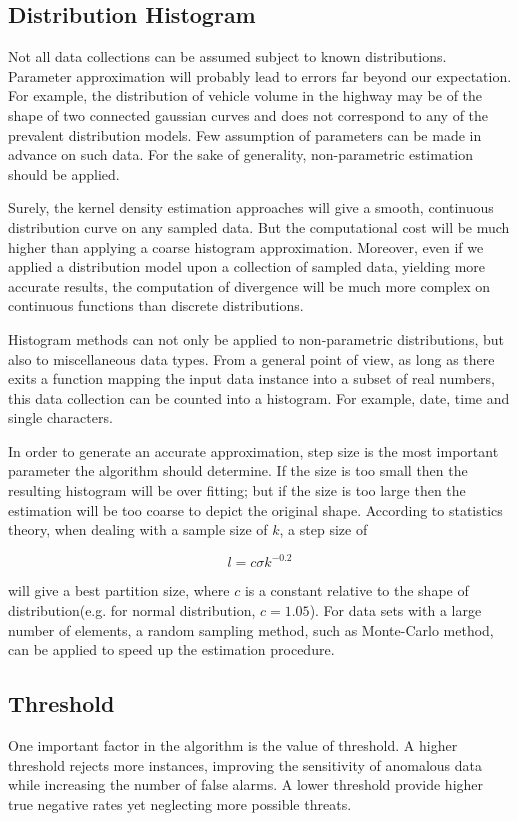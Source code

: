 \documentclass[10pt,conference,letterpaper]{IEEEtran}
\begin{document}
		\subsection{Distribution Histogram}\label{sec:alg-histogram}
			Not all data collections can be assumed subject to known distributions. Parameter approximation will probably lead to errors far beyond our expectation. For example, the distribution of vehicle volume in the highway may be of the shape of two connected gaussian curves and does not correspond to any of the prevalent distribution models. Few assumption of parameters can be made in advance on such data. For the sake of generality, non-parametric estimation should be applied.
			
			Surely, the kernel density estimation approaches will give a smooth, continuous distribution curve on any sampled data. But the computational cost will be much higher than applying a coarse histogram approximation.
			Moreover, even if we applied a distribution model upon a collection of sampled data, yielding more accurate results, the computation of divergence will be much more complex on continuous functions than discrete distributions.
			
			Histogram methods can not only be applied to non-parametric distributions, but also to miscellaneous data types. From a general point of view, as long as there exits a function mapping the input data instance into a subset of real numbers, this data collection can be counted into a histogram. For example, date, time and single characters.
	
			In order to generate an accurate approximation, step size is the most important parameter the algorithm should determine. If the size is too small then the resulting histogram will be over fitting; but if the size is too large then the estimation will be too coarse to depict the original shape. According to statistics theory, when dealing with a sample size of $k$, a step size of 
	
			\begin{equation}\label{equ:step-size}
				l = c \sigma k^{-0.2}
			\end{equation}
	
			will give a best partition size, where $c$ is a constant relative to the shape of distribution(e.g. for normal distribution, $c=1.05$). For data sets with a large number of elements, a random sampling method, such as Monte-Carlo method, can be applied to speed up the estimation procedure.
	
		\subsection{Threshold}\label{sec:alg-threshold}
			One important factor in the algorithm is the value of threshold. A higher threshold rejects more instances, improving the sensitivity of anomalous data while increasing the number of false alarms. A lower threshold provide higher true negative rates yet neglecting more possible threats.
			
\end{document}
